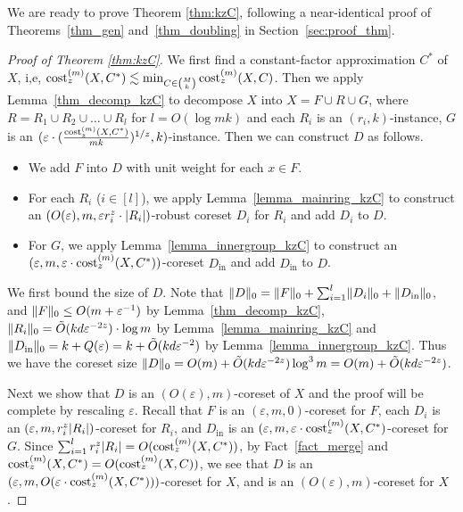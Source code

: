 \documentclass[11pt,letterpaper]{article}
\theoremstyle{definition}
\newcommand{\eps}{\varepsilon}
\newcommand{\inn}{{\mathrm{in}}}
\DeclarePairedDelimiter{\abs}{\lvert}{\rvert}
\DeclarePairedDelimiter{\norm}{\lVert}{\rVert}
\begin{document}
We are ready to prove Theorem \ref{thm:kzC}, following a near-identical proof of Theorems~\ref{thm_gen} and~\ref{thm_doubling} in Section~\ref{sec:proof_thm}.
%

\begin{proof}[Proof of Theorem \ref{thm:kzC}]
    We first find a constant-factor approximation $C^\ast$ of $X$, i,e, $\cost[m]_z(X,C^\ast)\lesssim \min_{C\in \binom{M}{k}} \cost[m]_z(X,C) $. Then we apply Lemma~\ref{thm_decomp_kzC} to decompose $X$ into $X=F\cup R\cup G$, where $R=R_1\cup R_2\cup \dots \cup R_l$ for $l=O(\log mk)$ and each $R_i$ is an $(r_i, k)$-instance, $G$ is an $(\eps \cdot (\frac{\cost[m]_z(X,C^\ast)}{mk})^{1/z}, k)$-instance. Then we can construct $D$ as follows.

    \begin{itemize}[itemsep=0pt,topsep=0pt]
        \item We add $F$ into $D$ with unit weight for each $x\in F$.
        \item For each $R_i$ ($i\in [l]$), we apply Lemma~\ref{lemma_mainring_kzC} to construct an $(O(\eps),m,\eps r_i^z\cdot \abs{R_i} )$-robust coreset $D_i$ for $R_i$ and add $D_i$ to $D$.
        \item For $G$, we apply Lemma~\ref{lemma_innergroup_kzC} to construct an $(\eps,m,\eps\cdot \cost[m]_z(X,C^\ast))$-coreset $D_{\inn}$ and add $D_{\inn}$ to $D$.
    \end{itemize}

    We first bound the size of $D$. Note that $\norm{D}_0=\norm{F}_0+\sum_{i=1}^l\norm{D_i}_0+\norm{D_{\inn}}_0$, and $\norm{F}_0\leq O(m + \eps^{-1})$ by Lemma~\ref{thm_decomp_kzC}, $\norm{R_i}_0=\tilde{O}(kd\eps^{-2z})\cdot \log m$ by Lemma~\ref{lemma_mainring_kzC} and $\norm{D_{\inn}}_0=k+Q(\eps)=k+\tilde{O}(kd\eps^{-2})$ by Lemma~\ref{lemma_innergroup_kzC}. Thus we have the coreset size $\norm{D}_0=O(m)+\tilde{O}(kd\eps^{-2z})\log^3{m}=O(m)+ \tilde{O}(kd\eps^{-2z})$.

    Next we show that $D$ is an $(O(\eps),m)$-coreset of $X$ and the proof will be complete by rescaling $\eps$. Recall that $F$ is an $(\eps,m,0)$-coreset for $F$, each $D_i$ is an $(\eps,m,r_i^z \abs{R_i})$-coreset for $R_i$, and $D_{\inn}$ is an $(\eps,m,\eps\cdot \cost[m]_z(X,C^\ast)$-coreset for $G$. Since $\sum_{i=1}^lr_i^z \abs{R_i}=O(\cost[m]_z(X,C^\ast)) $, by Fact~\ref{fact_merge} and $\cost[m]_z(X,C^\ast)=O(\cost[m]_z(X,C))$, we see that $D$ is an $(\eps,m,O(\eps \cdot \cost[m]_z(X,C^\ast)))$-coreset for $X$, and is an $(O(\eps), m)$-coreset for $X$.
\end{proof}
\end{document}
